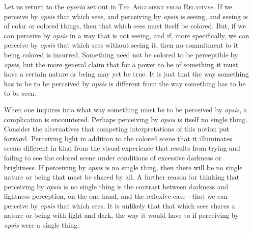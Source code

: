 Let us return to the \emph{aporia} set out in \textsc{The Argument from Relatives}. If we perceive by \emph{opsis} that which sees, and perceiving by \emph{opsis} is seeing, and seeing is of color or colored things, then that which sees must itself be colored. But, if we can perceive by \emph{opsis} in a way that is not seeing, and if, more specifically, we can perceive by \emph{opsis} that which sees without seeing it, then no commitment to it being colored is incurred. Something need not be colored to be perceptible by \emph{opsis}, but the more general claim that for a power to be of something it must have a certain nature or being may yet be true. It is just that the way something has to be to be perceived by \emph{opsis} is different from the way something has to be to be seen.

When one inquires into what way something must be to be perceived by \emph{opsis}, a complication is encountered. Perhaps perceiving by \emph{opsis} is itself no single thing. Consider the alternatives that competing interpretations of this notion put forward. Perceiving light in addition to the colored scene that it illuminates seems different in kind from the visual experience that results from trying and failing to see the colored scene under conditions of excessive darkness or brightness. If perceiving by \emph{opsis} is no single thing, then there will be no single nature or being that must be shared by all. A further reason for thinking that perceiving by \emph{opsis} is no single thing is the contrast between darkness and lightness perception, on the one hand, and the reflexive case—that we can perceive by \emph{opsis} that which sees. It is unlikely that that which sees shares a nature or being with light and dark, the way it would have to if perceiving by \emph{opsis} were a single thing. 



